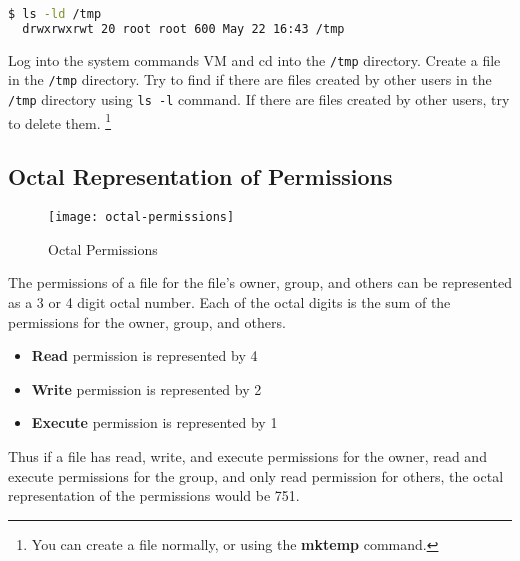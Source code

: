 \begin{lstlisting}[language=bash]
  $ ls -ld /tmp
  drwxrwxrwt 20 root root 600 May 22 16:43 /tmp
\end{lstlisting}

\begin{exercise}
  Log into the system commands VM and cd into the \texttt{/tmp} directory.
  Create a file in the \texttt{/tmp} directory.
  Try to find if there are files created by other users in the \texttt{/tmp} directory using \texttt{ls -l} command.
  If there are files created by other users, try to delete them.
  \footnote{
    You can create a file normally, or using the \textbf{mktemp} command.
  }
\end{exercise}

\subsection{Octal Representation of Permissions}

\begin{figure}
  \texttt{[image: octal-permissions]}
  \caption[Octal Permissions]{Octal Permissions}
\end{figure}

The permissions of a file for the file's owner, group, and others can be represented as a 3 or 4 digit octal number.
Each of the octal digits is the sum of the permissions for the owner, group, and others.

\begin{itemize}
  \item \textbf{Read} permission is represented by 4
  \item \textbf{Write} permission is represented by 2
  \item \textbf{Execute} permission is represented by 1
\end{itemize}

Thus if a file has read, write, and execute permissions for the owner, read and execute permissions for the group, and only read permission for others, the octal representation of the permissions would be 751.

